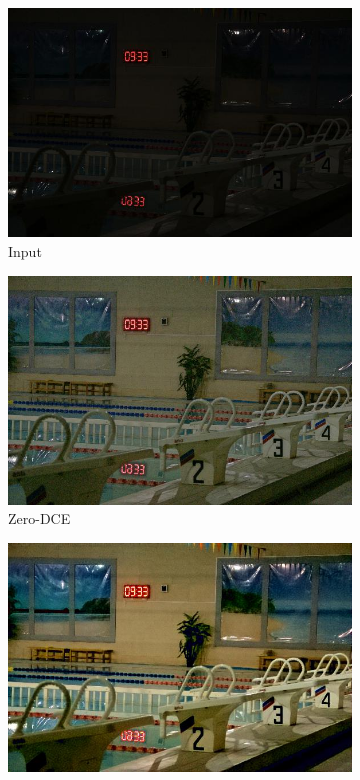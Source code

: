 \documentclass[a4paper]{ctexart}
\begin{document}
		\begin{figure}[htb]
			\centering
			\begin{subfigure}{0.19\textwidth}
				\includegraphics[width=\linewidth]{picture/LLIE/Experiment/Input}
				\captionsetup{font=scriptsize}
				\caption{Input}
				\label{fig: Input}
			\end{subfigure}
			\begin{subfigure}{0.19\textwidth}
				\includegraphics[width=\linewidth]{picture/LLIE/Experiment/Zero-DCE}				
				\captionsetup{font=scriptsize}
				\caption{Zero-DCE}
				\label{fig: Zero-DCE}	
			\end{subfigure}
			\begin{subfigure}{0.19\textwidth}
				\includegraphics[width=\linewidth]{picture/LLIE/Experiment/MBLLEN}

\end{subfigure}
\end{figure}
\end{document}

